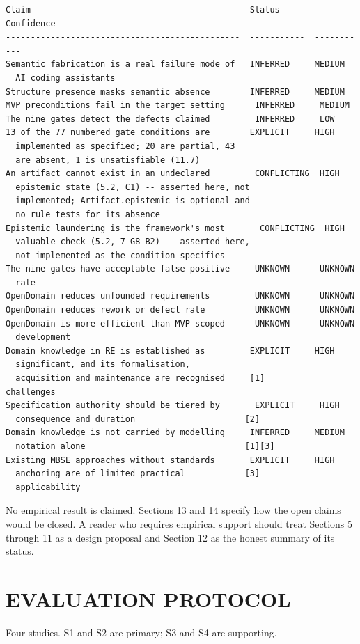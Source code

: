 \documentclass[11pt,a4paper]{article}
\begin{document}
\begin{Verbatim}[fontsize=\footnotesize,breaklines=true,breakanywhere=true,breakautoindent=false,samepage=false]
Claim                                            Status       Confidence
-----------------------------------------------  -----------  -----------
Semantic fabrication is a real failure mode of   INFERRED     MEDIUM
  AI coding assistants
Structure presence masks semantic absence        INFERRED     MEDIUM
MVP preconditions fail in the target setting      INFERRED     MEDIUM
The nine gates detect the defects claimed         INFERRED     LOW
13 of the 77 numbered gate conditions are        EXPLICIT     HIGH
  implemented as specified; 20 are partial, 43
  are absent, 1 is unsatisfiable (11.7)
An artifact cannot exist in an undeclared         CONFLICTING  HIGH
  epistemic state (5.2, C1) -- asserted here, not
  implemented; Artifact.epistemic is optional and
  no rule tests for its absence
Epistemic laundering is the framework's most       CONFLICTING  HIGH
  valuable check (5.2, 7 G8-B2) -- asserted here,
  not implemented as the condition specifies
The nine gates have acceptable false-positive     UNKNOWN      UNKNOWN
  rate
OpenDomain reduces unfounded requirements         UNKNOWN      UNKNOWN
OpenDomain reduces rework or defect rate          UNKNOWN      UNKNOWN
OpenDomain is more efficient than MVP-scoped      UNKNOWN      UNKNOWN
  development
Domain knowledge in RE is established as         EXPLICIT     HIGH
  significant, and its formalisation,
  acquisition and maintenance are recognised     [1]
challenges
Specification authority should be tiered by       EXPLICIT     HIGH
  consequence and duration                      [2]
Domain knowledge is not carried by modelling     INFERRED     MEDIUM
  notation alone                                [1][3]
Existing MBSE approaches without standards       EXPLICIT     HIGH
  anchoring are of limited practical            [3]
  applicability
\end{Verbatim}

No empirical result is claimed. Sections 13 and 14 specify how the open claims would be closed. A reader who requires empirical support should treat Sections 5 through 11 as a design proposal and Section 12 as the honest summary of its status.

\section{EVALUATION PROTOCOL}

Four studies. S1 and S2 are primary; S3 and S4 are supporting.
\end{document}
